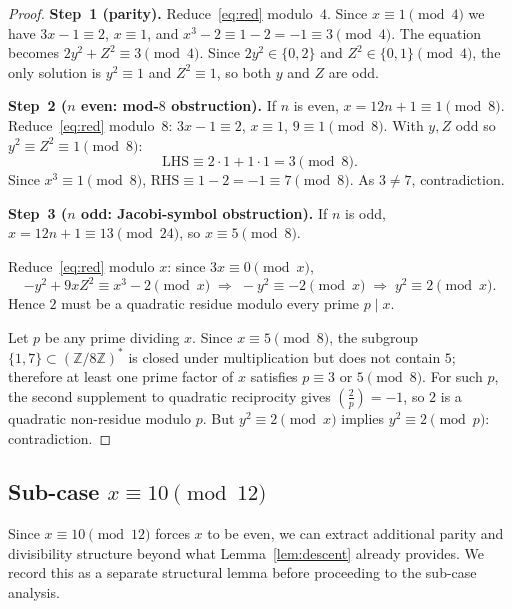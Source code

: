 \documentclass[12pt, a4paper]{amsart}
\theoremstyle{plain}
\theoremstyle{definition}
\begin{document}
\begin{proof}
  \textbf{Step~1 (parity).}
  Reduce~\eqref{eq:red} modulo~$4$.  Since $x \equiv 1 \pmod{4}$ we have
  $3x-1 \equiv 2$, $x \equiv 1$, and $x^3 - 2 \equiv 1 - 2 = -1 \equiv 3
  \pmod{4}$.  The equation becomes $2y^2 + Z^2 \equiv 3 \pmod{4}$.
  Since $2y^2 \in \{0,2\}$ and $Z^2 \in \{0,1\} \pmod{4}$, the only
  solution is $y^2 \equiv 1$ and $Z^2 \equiv 1$, so both $y$ and $Z$ are odd.

  \textbf{Step~2 ($n$ even: mod-$8$ obstruction).}
  If $n$ is even, $x = 12n+1 \equiv 1 \pmod{8}$.  Reduce~\eqref{eq:red}
  modulo~$8$: $3x-1 \equiv 2$, $x \equiv 1$, $9 \equiv 1 \pmod{8}$.
  With $y, Z$ odd so $y^2 \equiv Z^2 \equiv 1 \pmod{8}$:
  \[
    \mathrm{LHS} \equiv 2 \cdot 1 + 1 \cdot 1 = 3 \pmod{8}.
  \]
  Since $x^3 \equiv 1 \pmod{8}$, $\mathrm{RHS} \equiv 1 - 2 = -1 \equiv 7
  \pmod{8}$.  As $3 \neq 7$, contradiction.

  \textbf{Step~3 ($n$ odd: Jacobi-symbol obstruction).}
  If $n$ is odd, $x = 12n+1 \equiv 13 \pmod{24}$, so $x \equiv 5 \pmod{8}$.

  Reduce~\eqref{eq:red} modulo $x$: since $3x \equiv 0 \pmod{x}$,
  \[
    -y^2 + 9xZ^2 \equiv x^3 - 2 \pmod{x}
    \;\Longrightarrow\;
    -y^2 \equiv -2 \pmod{x}
    \;\Longrightarrow\;
    y^2 \equiv 2 \pmod{x}.
  \]
  Hence $2$ must be a quadratic residue modulo every prime $p \mid x$.

  Let $p$ be any prime dividing $x$.  Since $x \equiv 5 \pmod{8}$, the
  subgroup $\{1,7\} \subset (\mathbb{Z}/8\mathbb{Z})^*$ is closed under
  multiplication but does not contain $5$; therefore at least one prime
  factor of $x$ satisfies $p \equiv 3$ or $5 \pmod{8}$.  For such $p$,
  the second supplement to quadratic reciprocity gives
  $\left(\tfrac{2}{p}\right) = -1$, so $2$ is a quadratic non-residue
  modulo $p$.  But $y^2 \equiv 2 \pmod{x}$ implies $y^2 \equiv 2 \pmod{p}$:
  contradiction.
\end{proof}

\subsection{Sub-case \texorpdfstring{$x \equiv 10 \pmod{12}$}{x ≡ 10 (mod 12)}}

Since $x \equiv 10 \pmod{12}$ forces $x$ to be even, we can extract additional
parity and divisibility structure beyond what Lemma~\ref{lem:descent} already
provides.  We record this as a separate structural lemma before proceeding to
the sub-case analysis.
\end{document}
